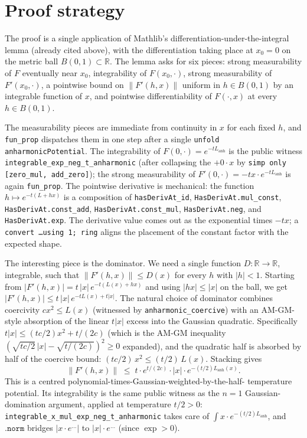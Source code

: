 \documentclass[11pt]{article}
\begin{document}
\section{Proof strategy}

The proof is a single application of Mathlib's
differentiation-under-the-integral lemma (already cited above), with
the differentiation taking place at \(x_0 = 0\) on the metric ball
\(B(0,1) \subset \mathbb{R}\). The lemma asks for six pieces:
strong measurability of \(F\) eventually near \(x_0\), integrability
of \(F(x_0, \cdot)\), strong measurability of \(F'(x_0, \cdot)\), a
pointwise bound on \(\|F'(h, x)\|\) uniform in \(h \in B(0,1)\) by an
integrable function of \(x\), and pointwise differentiability of
\(F(\cdot, x)\) at every \(h \in B(0,1)\).

The measurability pieces are immediate from continuity in \(x\) for
each fixed \(h\), and \texttt{fun\_prop} dispatches them in one step
after a single \texttt{unfold anharmonicPotential}. The integrability
of \(F(0, \cdot) = e^{-t L_{\mathrm{anh}}}\) is the public witness
\texttt{integrable\_exp\_neg\_t\_anharmonic} (after collapsing the
\(+0 \cdot x\) by \texttt{simp only [zero\_mul, add\_zero]}); the
strong measurability of \(F'(0, \cdot) = -t x \cdot e^{-t L_{\mathrm{anh}}}\)
is again \texttt{fun\_prop}. The pointwise derivative is mechanical:
the function \(h \mapsto e^{-t(L + h x)}\) is a composition of
\texttt{hasDerivAt\_id}, \texttt{HasDerivAt.mul\_const},
\texttt{HasDerivAt.const\_add}, \texttt{HasDerivAt.const\_mul},
\texttt{HasDerivAt.neg}, and \texttt{HasDerivAt.exp}. The derivative
value comes out as the exponential times \(-t x\); a \texttt{convert
\dots using 1; ring} aligns the placement of the constant factor
with the expected shape.

The interesting piece is the dominator. We need a single function
\(D : \mathbb{R} \to \mathbb{R}\), integrable, such that
\(\|F'(h, x)\| \le D(x)\) for every \(h\) with \(|h| < 1\). Starting
from \(|F'(h, x)| = t\,|x|\,e^{-t(L(x) + hx)}\) and using
\(|hx| \le |x|\) on the ball, we get
\(|F'(h, x)| \le t\,|x|\,e^{-tL(x) + t|x|}\). The natural choice
of dominator combines coercivity \(c x^2 \le L(x)\) (witnessed by
\texttt{anharmonic\_coercive}) with an AM-GM-style absorption of the
linear \(t|x|\) excess into the Gaussian quadratic. Specifically
\(t|x| \le (tc/2)x^2 + t/(2c)\) (which is the AM-GM inequality
\((\sqrt{tc/2}\,|x| - \sqrt{t/(2c)})^2 \ge 0\) expanded), and the
quadratic half is absorbed by half of the coercive bound:
\((tc/2)\,x^2 \le (t/2)\,L(x)\). Stacking gives
\[
\|F'(h, x)\| \;\le\; t \cdot e^{t/(2c)} \cdot |x| \cdot e^{-(t/2) L_{\mathrm{anh}}(x)}.
\]
This is a centred polynomial-times-Gaussian-weighted-by-the-half-
temperature potential. Its integrability is the same public witness
as the \(n=1\) Gaussian-domination argument, applied at temperature
\(t/2 > 0\): \texttt{integrable\_x\_mul\_exp\_neg\_t\_anharmonic}
takes care of \(\int x \cdot e^{-(t/2)L_{\mathrm{anh}}}\), and
\(.\texttt{norm}\) bridges \(|x \cdot e^{\dots}|\) to
\(|x| \cdot e^{\dots}\) (since \(\exp > 0\)).
\end{document}
